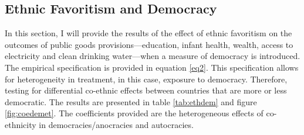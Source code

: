 \documentclass{wptemp}
\begin{document}
%



\subsection{Ethnic Favoritism and Democracy} \label{subsec2}
In this section, I will provide the results of the effect of ethnic favoritism on the outcomes of public goods provisions---education, infant health, wealth, access to electricity and clean drinking water---when a measure of democracy is introduced. The empirical specification is provided in equation \ref{eq2}. This specification allows for heterogeneity in treatment, in this case, exposure to democracy. Therefore, testing for differential co-ethnic effects between countries that are more or less democratic. The results are presented in table \ref{tab:ethdem} and figure \ref{fig:coedemet}. The coefficients provided are the heterogeneous effects of co-ethnicity in democracies/anocracies and autocracies.
\end{document}
